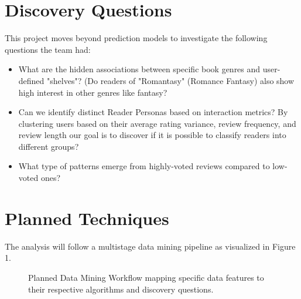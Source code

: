\documentclass[conference]{IEEEtran}
\begin{document}
\section{Discovery Questions}

This project moves beyond prediction models to investigate the following questions the team had:
\begin{itemize}
    \item What are the hidden associations between specific book genres and user-defined "shelves"? (Do readers of "Romantasy" (Romance Fantasy) also show high interest in other genres like fantasy?
    \item Can we identify distinct Reader Personas based on interaction metrics? By clustering users based on their average rating variance, review frequency, and review length our goal is to discover if it is possible to classify readers into different groups?
    \item  What type of patterns emerge from highly-voted reviews compared to low-voted ones?
\end{itemize}

\section{Planned Techniques}
The analysis will follow a multistage data mining pipeline as visualized in Figure 1.

\begin{figure}[htbp]
  \centering
  \caption{Planned Data Mining Workflow mapping specific data features to their respective algorithms and discovery questions.}
  \label{fig:pipeline}
\end{figure}
\end{document}
